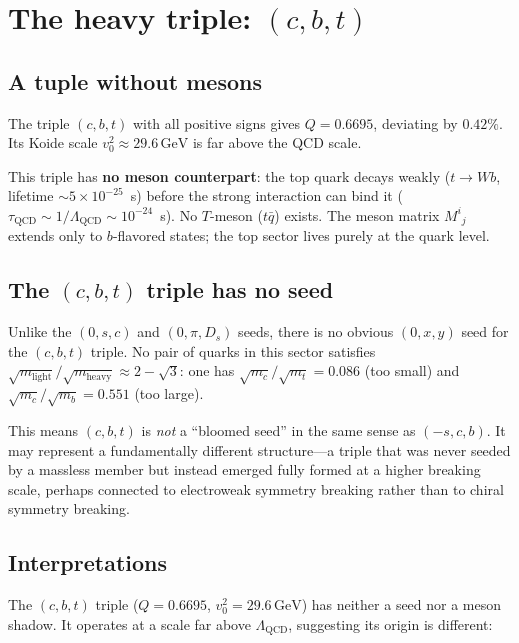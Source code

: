 \documentclass[12pt,a4paper]{article}
\newcommand{\GeV}{\,\text{GeV}}
\begin{document}
\section{The heavy triple: $(c, b, t)$}

\subsection{A tuple without mesons}

The triple $(c, b, t)$ with all positive signs gives $Q = 0.6695$,
deviating by $0.42\%$. Its Koide scale $v_0^2 \approx 29.6\GeV$
is far above the QCD scale.

This triple has \textbf{no meson counterpart}: the top quark decays
weakly ($t \to Wb$, lifetime $\sim 5 \times 10^{-25}$~s) before the
strong interaction can bind it ($\tau_{\text{QCD}} \sim 1/\Lambda_{\text{QCD}}
\sim 10^{-24}$~s). No $T$-meson ($t\bar{q}$) exists. The meson matrix
$M^i{}_j$ extends only to $b$-flavored states; the top sector lives
purely at the quark level.

\subsection{The $(c,b,t)$ triple has no seed}

Unlike the $(0,s,c)$ and $(0,\pi,D_s)$ seeds, there is no obvious
$(0, x, y)$ seed for the $(c,b,t)$ triple. No pair of quarks in this
sector satisfies $\sqrt{m_{\text{light}}}/\sqrt{m_{\text{heavy}}}
\approx 2 - \sqrt{3}$: one has $\sqrt{m_c}/\sqrt{m_t} = 0.086$
(too small) and $\sqrt{m_c}/\sqrt{m_b} = 0.551$ (too large).

This means $(c,b,t)$ is \emph{not} a ``bloomed seed'' in the same
sense as $(-s,c,b)$. It may represent a fundamentally different
structure---a triple that was never seeded by a massless member but
instead emerged fully formed at a higher breaking scale, perhaps
connected to electroweak symmetry breaking rather than to chiral
symmetry breaking.

\subsection{Interpretations}

The $(c,b,t)$ triple ($Q = 0.6695$, $v_0^2 = 29.6\GeV$) has
neither a seed nor a meson shadow. It operates at a scale far
above $\Lambda_{\text{QCD}}$, suggesting its origin is different:
\end{document}
